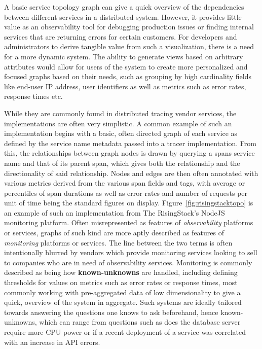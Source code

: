 \documentclass[12pt,pdftex,titlepage]{report}
\begin{document}
                A basic service topology graph can give a quick overview of the dependencies between different services in a distributed system. However, it provides little value as an observability tool
                for debugging production issues or finding internal services that are returning errors for certain customers. For developers and administrators to derive tangible value from such a 
                visualization, there is a need for a more dynamic system. The ability to generate views based on arbitrary attributes would allow for users of the system to create more personalized and 
                focused graphs based on their needs, such as grouping by high cardinality fields like end-user IP address, user identifiers as well as metrics such as error rates, response times 
                etc\cite{doingitwrongtopo}.

                While they are commonly found in distributed tracing vendor services, the implementations are often very simplistic. A common example of such an implementation begins with a basic, often directed
                graph of each service as defined by the service name metadata passed into a tracer implementation. From this, the relationships between graph nodes is drawn by querying a spans service name
                and that of its parent span, which gives both the relationship and the directionality of said relationship. Nodes and edges are then often annotated with various metrics derived from the various
                span fields and tags, with average or percentiles of span durations as well as error rates and number of requests per unit of time being the standard figures on display. Figure~\ref{fig:risingstacktopo}
                is an example of such an implementation from The RisingStack's NodeJS monitoring platform. Often misrepresented as features of \textit{observability} platforms or services, graphs of such kind are
                more aptly described as features of \textit{monitoring} platforms or services. The line between the two terms is often intentionally blurred by vendors which provide monitoring services looking to sell
                to companies who are in need of observability services. Monitoring is commonly described as being how \textbf{known-unknowns} are handled, including defining thresholds for values on metrics such as
                error rates or response times, most commonly working with pre-aggregated data of low dimensionality to give a quick, overview of the system in aggregate. Such systems are ideally tailored towards 
                answering the questions one knows to ask beforehand, hence known-unknowns, which can range from questions such as does the database server require more CPU power or if a recent deployment of a service
                was correlated with an increase in API errors. 
\end{document}
